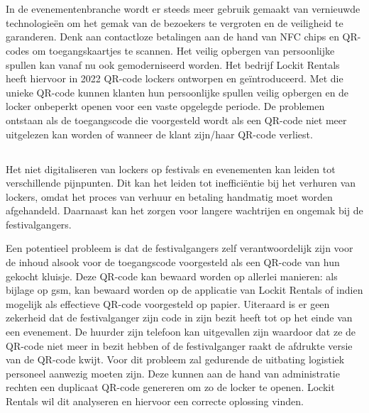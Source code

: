 
\chapter{}%
\label{ch:inleiding}

In de evenementenbranche wordt er steeds meer gebruik gemaakt van vernieuwde technologieën om het gemak van de bezoekers te vergroten en de veiligheid te garanderen. Denk aan contactloze betalingen aan de hand van NFC chips en QR-codes om toegangskaartjes te scannen. Het veilig opbergen van persoonlijke spullen kan vanaf nu ook gemoderniseerd worden. Het bedrijf Lockit Rentals heeft hiervoor in 2022 QR-code lockers ontworpen en geïntroduceerd. Met die unieke QR-code kunnen klanten hun persoonlijke spullen veilig opbergen en de locker onbeperkt openen voor een vaste opgelegde periode. De problemen ontstaan als de toegangscode die voorgesteld wordt als een QR-code niet meer uitgelezen kan worden of wanneer de klant zijn/haar QR-code verliest. 

\newpage

\section{}%
\label{sec:probleemstelling}

Het niet digitaliseren van lockers op festivals en evenementen kan leiden tot verschillende pijnpunten. Dit kan het leiden tot inefficiëntie bij het verhuren van lockers, omdat het proces van verhuur en betaling handmatig moet worden afgehandeld. Daarnaast kan het zorgen voor langere wachtrijen en ongemak bij de festivalgangers. 

Een potentieel probleem is dat de festivalgangers zelf verantwoordelijk zijn voor de inhoud alsook voor de toegangscode voorgesteld als een QR-code van hun gekocht kluisje. Deze QR-code kan bewaard worden op allerlei manieren: als bijlage op gsm, kan bewaard worden op de applicatie van Lockit Rentals of indien mogelijk als effectieve QR-code voorgesteld op papier. Uiteraard is er geen zekerheid dat de festivalganger zijn code in zijn bezit heeft tot op het einde van een evenement. De huurder zijn telefoon kan uitgevallen zijn waardoor dat ze de QR-code niet meer in bezit hebben of de festivalganger raakt de afdrukte versie van de QR-code kwijt. Voor dit probleem zal gedurende de uitbating logistiek personeel aanwezig moeten zijn. Deze kunnen aan de hand van administratie rechten een duplicaat QR-code genereren om zo de locker te openen. Lockit Rentals wil dit analyseren en hiervoor een correcte oplossing vinden. 

